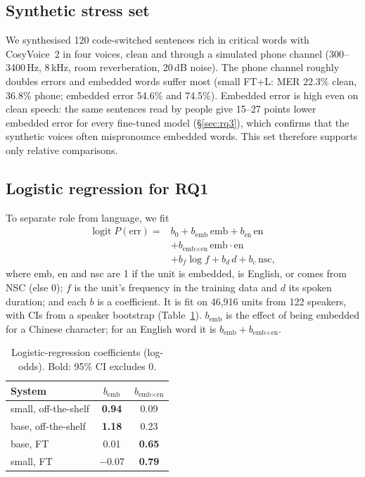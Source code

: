 \subsection{Synthetic stress set}\label{app:synth}
We synthesised 120 code-switched sentences rich in critical words with CosyVoice~2 in four voices, clean and through a simulated phone channel (300--3400\,Hz, 8\,kHz, room reverberation, 20\,dB noise). The phone channel roughly doubles errors and embedded words suffer most (small FT+L: MER 22.3\% clean, 36.8\% phone; embedded error 54.6\% and 74.5\%). Embedded error is high even on clean speech: the same sentences read by people give 15--27 points lower embedded error for every fine-tuned model (\S\ref{sec:rq3}), which confirms that the synthetic voices often mispronounce embedded words. This set therefore supports only relative comparisons.



\subsection{Logistic regression for RQ1}\label{app:reg}
To separate role from language, we fit
\begin{equation}
\begin{split}
  \operatorname{logit} P(\text{err}) = {}& b_0 + b_{\text{emb}}\,\text{emb} + b_{\text{en}}\,\text{en} \\
  &+ b_{\text{emb}\times\text{en}}\,\text{emb}\cdot\text{en} \\
  &+ b_f \log f + b_d\, d + b_c\, \text{nsc},
\end{split}
\end{equation}
where emb, en and nsc are 1 if the unit is embedded, is English, or comes from NSC (else 0); $f$ is the unit's frequency in the training data and $d$ its spoken duration; and each $b$ is a coefficient. It is fit on 46{,}916 units from 122 speakers, with CIs from a speaker bootstrap (Table~\ref{tab:reg}). $b_{\text{emb}}$ is the effect of being embedded for a Chinese character; for an English word it is $b_{\text{emb}} + b_{\text{emb}\times\text{en}}$.

\begin{table}[h]
\centering
\small
\begin{tabular}{lcc}
\toprule
System & $b_{\text{emb}}$ & $b_{\text{emb}\times\text{en}}$ \\
\midrule
small, off-the-shelf & \textbf{0.94} & 0.09 \\
base, off-the-shelf & \textbf{1.18} & 0.23 \\
base, FT & 0.01 & \textbf{0.65} \\
small, FT & $-$0.07 & \textbf{0.79} \\
\bottomrule
\end{tabular}
\caption{Logistic-regression coefficients (log-odds). Bold: 95\% CI excludes 0.}
\label{tab:reg}
\end{table}

